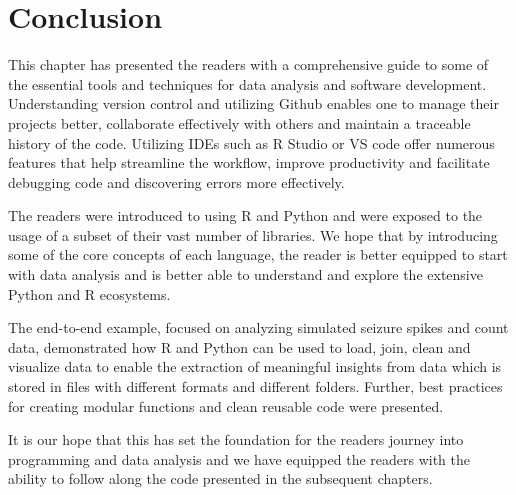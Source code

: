 \section{Conclusion}

This chapter has presented the readers with a comprehensive guide to some of the essential tools and techniques for data analysis and software development.
Understanding version control and utilizing Github enables one to manage their projects better, collaborate effectively with others and maintain a traceable history of the code. Utilizing IDEs such as R Studio or VS code offer numerous features that help streamline the workflow, improve productivity and facilitate debugging code and discovering errors more effectively.

The readers were introduced to using R and Python and were exposed to the usage of a subset of their vast number of libraries. We hope that by introducing some of the core concepts of each language, the reader is better equipped to start with data analysis and is better able to understand and explore the extensive Python and R ecosystems.

The end-to-end example, focused on analyzing simulated seizure spikes and count data, demonstrated how R and Python can be used to load, join, clean and visualize data to enable the extraction of meaningful insights from data which is stored in files with different formats and different folders. Further, best practices for creating modular functions and clean reusable code were presented.

It is our hope that this has set the foundation for the readers journey into programming and data analysis and we have equipped the readers with the ability to follow along the code presented in the subsequent chapters.
